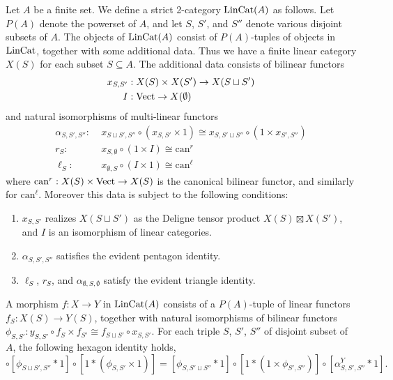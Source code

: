 \documentclass{amsart}
\begin{document}
Let $A$ be a finite set. We define a strict 2-category $\mathrm{LinCat}(A)$ as follows. Let $P(A)$ denote the powerset of $A$, and let $S$, $S'$, and $S''$ denote various disjoint subsets of $A$. The objects of $\mathrm{LinCat}(A)$ consist of  $P(A)$-tuples of objects in $\mathrm{LinCat}$, together with some additional data. Thus we have a finite linear category $X(S)$ for each subset $S \subseteq A$. The additional data consists of bilinear functors
\begin{align*}
		x_{S,S'}: & \; X(S) \times X(S') \to X(S \sqcup S') \\
		I: & \; \mathrm{Vect} \to X(\emptyset)
\end{align*}
and natural isomorphisms of multi-linear functors
\begin{align*}
		\alpha_{S, S', S''}:  & \; x_{S \sqcup S', S''}\circ (x_{S,S'} \times 1) \cong x_{S, S' \sqcup S''} \circ (1 \times x_{S', S''}) \\
		r_S: & \; x_{S, \emptyset} \circ (1 \times I)  \cong  \textrm{can}^r \\
		\ell_{S}: & \; x_{ \emptyset, S} \circ (I \times 1)  \cong  \textrm{can}^\ell
\end{align*}
where $\textrm{can}^r: X(S) \times \mathrm{Vect} \to X(S)$ is the canonical bilinear functor, and similarly for $\textrm{can}^\ell$. 
Moreover this data is subject to the following conditions: 
\begin{enumerate}
	\item $x_{S,S'}$ realizes $X(S \sqcup S')$ as the Deligne tensor product  $X(S) \boxtimes X(S') $, and $I$ is an isomorphism of linear categories. 
	\item $	\alpha_{S, S', S''}$ satisfies the evident pentagon identity. 
	\item $\ell_S$, $r_S$, and $\alpha_{\emptyset, S, \emptyset}$ satisfy the evident triangle identity.
\end{enumerate}

A morphism $f:X \to Y$ in $\mathrm{LinCat}(A)$ consists of a $P(A)$-tuple of linear functors $f_S: X(S) \to Y(S)$, together with natural isomorphisms of bilinear functors $\phi_{S,S'}: y_{S,S'} \circ f_S \times f_{S'} \cong f_{S \sqcup S'} \circ x_{S,S'}$. For each triple $S$, $S'$, $S''$ of disjoint subset of $A$, the following hexagon identity holds,
\begin{equation*}
	[1 * \alpha^X_{S, S', S''}] \circ [\phi_{S \sqcup S', S''} * 1] \circ [1 *(\phi_{S, S'} \times 1)] = 
		[\phi_{S, S' \sqcup S''} * 1] \circ [1 * (1 \times \phi_{S', S''})] \circ [\alpha^Y_{S,S', S''} * 1].
\end{equation*}
\end{document}
